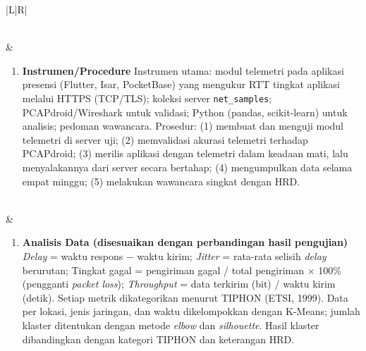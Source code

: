 \documentclass[11pt,a4paper]{article}
\begin{document}
\begin{longtable}{|L|R|}
\begin{enumerate}[label=\arabic*.,start=2]
\end{enumerate}
\\
&
\begin{enumerate}[label=\arabic*.,start=3]
\item \textbf{Instrumen/Procedure}\newline
Instrumen utama: modul telemetri pada aplikasi presensi (Flutter, Isar, PocketBase) yang mengukur RTT tingkat aplikasi melalui HTTPS (TCP/TLS); koleksi server \texttt{net\_samples}; PCAPdroid/Wireshark untuk validasi; Python (pandas, scikit-learn) untuk analisis; pedoman wawancara.\newline
Prosedur:\newline
(1) membuat dan menguji modul telemetri di server uji;\newline
(2) memvalidasi akurasi telemetri terhadap PCAPdroid;\newline
(3) merilis aplikasi dengan telemetri dalam keadaan mati, lalu menyalakannya dari server secara bertahap;\newline
(4) mengumpulkan data selama empat minggu;\newline
(5) melakukan wawancara singkat dengan HRD.
\end{enumerate}
\\
&
\begin{enumerate}[label=\arabic*.,start=4]
\item \textbf{Analisis Data (disesuaikan dengan perbandingan hasil pengujian)}\newline
\textit{Delay} = waktu respons − waktu kirim; \textit{Jitter} = rata-rata selisih \textit{delay} berurutan; Tingkat gagal = pengiriman gagal / total pengiriman × 100\% (pengganti \textit{packet loss}); \textit{Throughput} = data terkirim (bit) / waktu kirim (detik). Setiap metrik dikategorikan menurut TIPHON (ETSI, 1999). Data per lokasi, jenis jaringan, dan waktu dikelompokkan dengan K-Means; jumlah klaster ditentukan dengan metode \textit{elbow} dan \textit{silhouette}. Hasil klaster dibandingkan dengan kategori TIPHON dan keterangan HRD.
\end{enumerate}
\\ \hline


\end{longtable}
\end{document}
